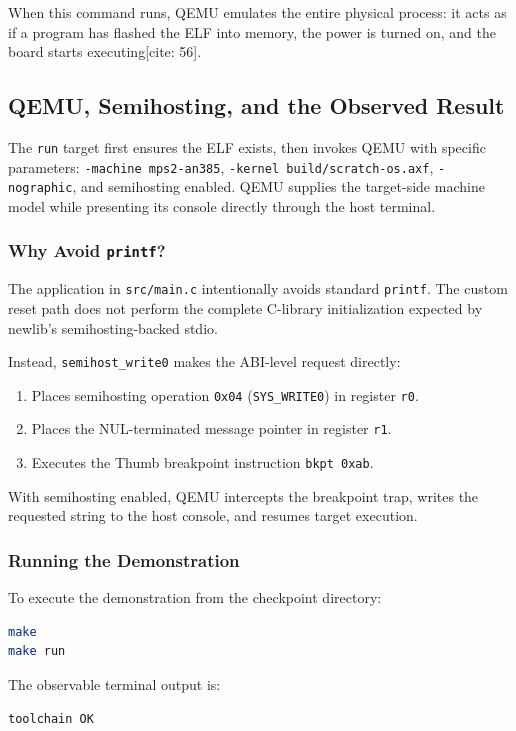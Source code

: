When this command runs, QEMU emulates the entire physical process: it acts as if a program has flashed the ELF into memory, the power is turned on, and the board starts executing[cite: 56].

\subsection{QEMU, Semihosting, and the Observed Result}
The \texttt{run} target first ensures the ELF exists, then invokes QEMU with specific parameters: \texttt{-machine mps2-an385}, \texttt{-kernel build/scratch-os.axf}, \texttt{-nographic}, and semihosting enabled. QEMU supplies the target-side machine model while presenting its console directly through the host terminal.

\subsubsection{Why Avoid \texttt{printf}?}
The application in \texttt{src/main.c} intentionally avoids standard \texttt{printf}. The custom reset path does not perform the complete C-library initialization expected by newlib's semihosting-backed stdio. 

Instead, \texttt{semihost\_write0} makes the ABI-level request directly:
\begin{enumerate}
    \item Places semihosting operation \texttt{0x04} (\texttt{SYS\_WRITE0}) in register \texttt{r0}.
    \item Places the NUL-terminated message pointer in register \texttt{r1}.
    \item Executes the Thumb breakpoint instruction \texttt{bkpt 0xab}.
\end{enumerate}
With semihosting enabled, QEMU intercepts the breakpoint trap, writes the requested string to the host console, and resumes target execution.

\subsubsection{Running the Demonstration}
To execute the demonstration from the checkpoint directory:
\begin{lstlisting}[language=bash]
make
make run
\end{lstlisting}

The observable terminal output is:
\begin{lstlisting}
toolchain OK
\end{lstlisting}


